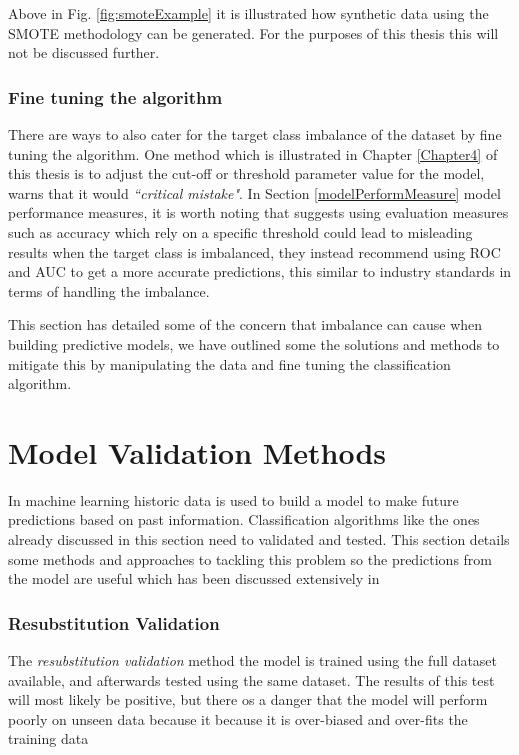 Above in Fig. \ref{fig:smoteExample} it is illustrated how synthetic data using the SMOTE methodology can be generated. For the purposes of this thesis this will not be discussed further.

\subsubsection{Fine tuning the algorithm}
There are ways to also cater for the target class imbalance of the dataset by fine tuning the algorithm. One method which is illustrated in Chapter \ref{Chapter4} of this thesis is to adjust the cut-off or threshold parameter value for the model, \cite{provost_machine_2000} warns that it would \textit{``critical mistake"}. In Section \ref{modelPerformMeasure} model performance measures, it is  worth noting that \cite{chawla_editorial:_2004} suggests using evaluation measures such as accuracy which rely on a specific threshold could lead to misleading results when the target class is imbalanced, they instead recommend using ROC and AUC to get a more accurate predictions, this similar to industry standards in terms of handling the imbalance.

This section has detailed some of the concern that imbalance can cause when building predictive models, we have outlined some the solutions and methods to mitigate this by manipulating the data and fine tuning the classification algorithm.


\section{Model Validation Methods}
In machine learning historic data is used to build a model to make future predictions based on past information. Classification algorithms like the ones already discussed in this section need to validated and tested. This section details some methods and approaches to tackling this problem so the predictions from the model are useful which has been discussed extensively in \citep{refaeilzadeh_cross-validation_2009}

\subsubsection{Resubstitution Validation}
The \textit{resubstitution validation} method the model is trained using the full dataset available, and afterwards tested using the same dataset. The results of this test will most likely be positive, but there os a danger that the model will perform poorly on unseen data because it because it is over-biased and over-fits the training data

